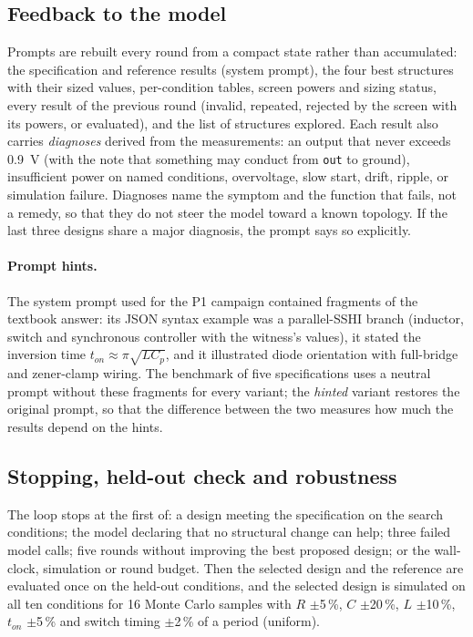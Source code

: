 \documentclass[journal]{IEEEtran}
\begin{document}
\subsection{Feedback to the model}\label{sec:diag}
Prompts are rebuilt every round from a compact state rather than accumulated: the specification and
reference results (system prompt), the four best structures with their sized values, per-condition
tables, screen powers and sizing status, every result of the previous round (invalid, repeated, rejected
by the screen with its powers, or evaluated), and the list of structures explored. Each result also
carries \emph{diagnoses} derived from the measurements: an output that never exceeds \SI{0.9}{V} (with the
note that something may conduct from \texttt{out} to ground), insufficient power on named conditions,
overvoltage, slow start, drift, ripple, or simulation failure. Diagnoses name the symptom and the
function that fails, not a remedy, so that they do not steer the model toward a known topology. If the
last three designs share a major diagnosis, the prompt says so explicitly.

\paragraph{Prompt hints.} The system prompt used for the P1 campaign contained fragments of the textbook
answer: its JSON syntax example was a parallel-SSHI branch (inductor, switch and synchronous controller
with the witness's values), it stated the inversion time $t_{on}\approx\pi\sqrt{L C_p}$, and it illustrated
diode orientation with full-bridge and zener-clamp wiring. The benchmark of five specifications uses a
neutral prompt without these fragments for every variant; the \emph{hinted} variant restores the original
prompt, so that the difference between the two measures how much the results depend on the hints.

\subsection{Stopping, held-out check and robustness}\label{sec:robust}
The loop stops at the first of: a design meeting the specification on the search conditions; the model
declaring that no structural change can help; three failed model calls; five rounds without improving
the best proposed design; or the wall-clock, simulation or round budget. Then the selected design and
the reference are evaluated once on the held-out conditions, and the selected design is simulated on all
ten conditions for 16 Monte Carlo samples with $R$ $\pm$5\,\%, $C$ $\pm$20\,\%, $L$ $\pm$10\,\%,
$t_{on}$ $\pm$5\,\% and switch timing $\pm$2\,\% of a period (uniform).
\end{document}
